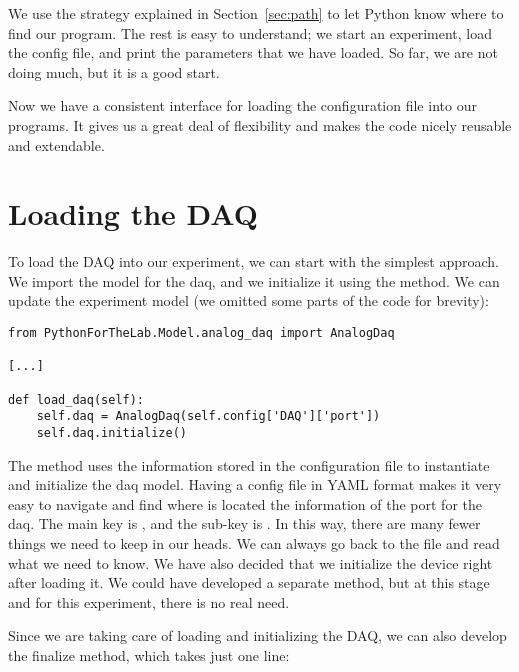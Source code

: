 We use the strategy explained in Section~\ref{sec:path} to let Python know where to find our program. The rest is easy to understand; we start an experiment, load the config file, and print the parameters that we have loaded. So far, we are not doing much, but it is a good start.

Now we have a consistent interface for loading the configuration file into our programs. It gives us a great deal of flexibility and makes the code nicely reusable and extendable.


\section{Loading the DAQ}\label{sec:loading-daq}
To load the DAQ into our experiment, we can start with the simplest approach. We import the model for the daq, and we initialize it using the  method. We can update the experiment model (we omitted some parts of the code for brevity):

\begin{verbatim}
from PythonForTheLab.Model.analog_daq import AnalogDaq

[...]

def load_daq(self):
    self.daq = AnalogDaq(self.config['DAQ']['port'])
    self.daq.initialize()
\end{verbatim}

The  method uses the information stored in the configuration file to instantiate and initialize the daq model. Having a config file in YAML format makes it very easy to navigate and find where is located the information of the port for the daq. The main key is , and the sub-key is . In this way, there are many fewer things we need to keep in our heads. We can always go back to the file and read what we need to know. We have also decided that we initialize the device right after loading it. We could have developed a separate method, but at this stage and for this experiment, there is no real need.

Since we are taking care of loading and initializing the DAQ, we can also develop the finalize method, which takes just one line:

